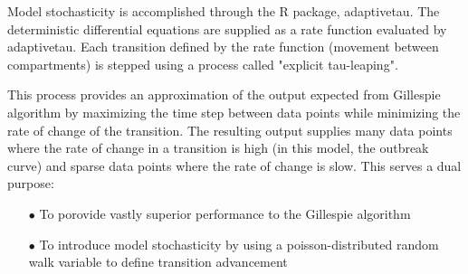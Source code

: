\documentclass[../Paper.tex]{subfiles}
\begin{document}
Model stochasticity is accomplished through the R package, adaptivetau\cite{johnson_2016}.
The deterministic differential equations are supplied as a rate function evaluated
by adaptivetau. Each transition defined by the rate function (movement between compartments)
is stepped using a process called "explicit tau-leaping"\cite{yang_gillespie_petzold_2007}.
\par
This process provides an approximation of the output expected from Gillespie algorithm by maximizing
the time step between data points while minimizing the rate of change of the transition.
The resulting output supplies many data points where the rate of change in a transition
is high (in this model, the outbreak curve) and sparse data points where the rate
of change is slow. This serves a dual purpose:
\par
\begin{enumerate}
  \item[$\bullet$]{To porovide vastly superior performance to the Gillespie algorithm}
  \item[$\bullet$]{To introduce model stochasticity by using a poisson-distributed
                   random walk variable to define transition advancement}
\end{enumerate}

\clearpage
\end{document}
